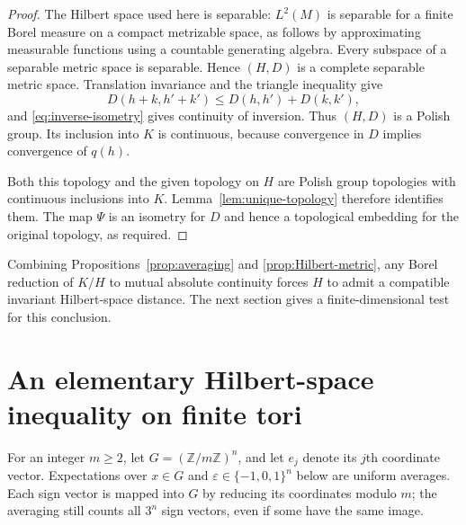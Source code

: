 \documentclass[11pt]{article}
\theoremstyle{definition}
\newcommand{\Z}{\mathbb Z}
\begin{document}
\begin{proof}
The Hilbert space used here is separable: $L^2(M)$ is separable for a
finite Borel measure on a compact metrizable space, as follows by
approximating measurable functions using a countable generating algebra.
Every subspace of a separable metric space is separable. Hence $(H,D)$
is a complete separable metric space. Translation invariance and the
triangle inequality give
\[
 D(h+k,h'+k')\le D(h,h')+D(k,k'),
\]
and \eqref{eq:inverse-isometry} gives continuity of inversion. Thus
$(H,D)$ is a Polish group. Its inclusion into $K$ is continuous, because
convergence in $D$ implies convergence of $q(h)$.

Both this topology and the given topology on $H$ are Polish group
topologies with continuous inclusions into $K$. Lemma~\ref{lem:unique-topology}
therefore identifies them. The map $\Psi$ is an isometry for $D$ and
hence a topological embedding for the original topology, as required.
\end{proof}

Combining Propositions~\ref{prop:averaging} and
\ref{prop:Hilbert-metric}, any Borel reduction of $K/H$ to mutual absolute
continuity forces $H$ to admit a compatible invariant Hilbert-space
distance. The next section gives a finite-dimensional test for this
conclusion.
\section{An elementary Hilbert-space inequality on finite tori}
For an integer $m\ge2$, let $G=(\Z/m\Z)^n$, and let $e_j$ denote its
$j$th coordinate vector. Expectations over $x\in G$ and
$\varepsilon\in\{-1,0,1\}^n$ below are uniform averages. Each sign
vector is mapped into $G$ by reducing its coordinates modulo $m$;
the averaging still counts all $3^n$ sign vectors, even if some have
the same image.
\end{document}
